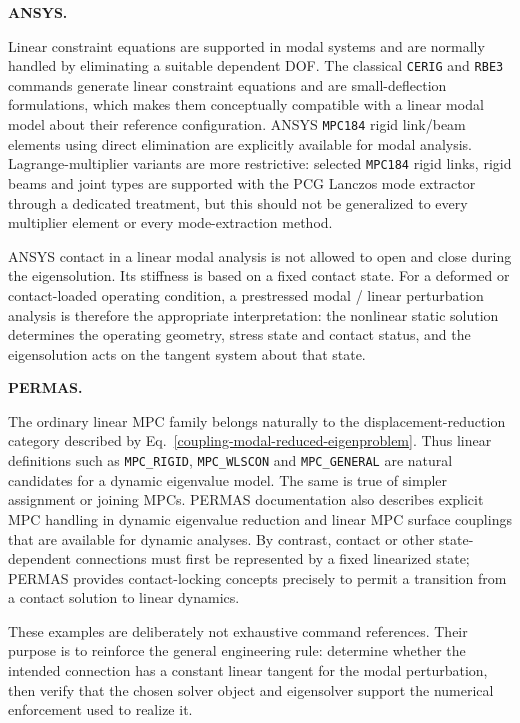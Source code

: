 \medskip\noindent\textbf{ANSYS.}\par\noindent
Linear constraint equations are supported in modal systems and are normally
handled by eliminating a suitable dependent DOF. The classical \texttt{CERIG}
and \texttt{RBE3} commands generate linear constraint equations and are
small-deflection formulations, which makes them conceptually compatible with a
linear modal model about their reference configuration. ANSYS \texttt{MPC184}
rigid link/beam elements using direct elimination are explicitly available for
modal analysis. Lagrange-multiplier variants are more restrictive: selected
\texttt{MPC184} rigid links, rigid beams and joint types are supported with the
PCG Lanczos mode extractor through a dedicated treatment, but this should not be
generalized to every multiplier element or every mode-extraction method.

ANSYS contact in a linear modal analysis is not allowed to open and close during
the eigensolution. Its stiffness is based on a fixed contact state. For a
deformed or contact-loaded operating condition, a prestressed modal / linear
perturbation analysis is therefore the appropriate interpretation: the nonlinear
static solution determines the operating geometry, stress state and contact
status, and the eigensolution acts on the tangent system about that state.

\medskip\noindent\textbf{PERMAS.}\par\noindent
The ordinary linear MPC family belongs naturally to the displacement-reduction
category described by Eq.~\eqref{coupling-modal-reduced-eigenproblem}. Thus
linear definitions such as \texttt{MPC\_\allowbreak RIGID},
\texttt{MPC\_\allowbreak WLSCON} and \texttt{MPC\_\allowbreak GENERAL} are natural
candidates for a dynamic eigenvalue model. The same is true of simpler
assignment or joining MPCs. PERMAS documentation also
describes explicit MPC handling in dynamic eigenvalue reduction and linear MPC
surface couplings that are available for dynamic analyses. By contrast, contact
or other state-dependent connections must first be represented by a fixed
linearized state; PERMAS provides contact-locking concepts precisely to permit a
transition from a contact solution to linear dynamics.

These examples are deliberately not exhaustive command references. Their purpose
is to reinforce the general engineering rule: determine whether the intended
connection has a constant linear tangent for the modal perturbation, then verify
that the chosen solver object and eigensolver support the numerical enforcement
used to realize it.

